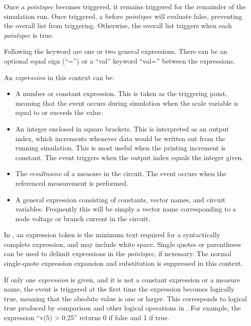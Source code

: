 Once a {\it pointspec} becomes triggered, it remains triggered for the
remainder of the simulation run.  Once triggered, a {\vt before} {\it
pointspec} will evaluate false, preventing the overall list from
triggering.  Otherwise, the overall list triggers when each {\it
pointspec} is true.

Following the keyword are one or two general expressions.  There can
be an optional equal sign (``{\vt =}'') or a ``{\vt val}'' keyword
``{\vt val=}'' between the expressions.

An {\it expression} in this context can be:
\begin{itemize}
\item{A number or constant expression.  This is taken as the
triggering point, meaning that the event occurs during simulation when
the scale variable is equal to or exceeds the value.}

\item{An integer enclosed in square brackets.  This is interpreted as
an output index, which increments whenever data would be written out
from the running simulation.  This is most useful when the printing
increment is constant.  The event triggers when the output index
equals the integer given.}

\item{The {\it resultname} of a measure in the circuit.  The event
occurs when the referenced measurement is performed.}

\item{A general expression consisting of constants, vector names, and
circuit variables.  Frequently this will be simply a vector name
corresponding to a node voltage or branch current in the circuit.}
\end{itemize}

In {\WRspice}, an expression token is the minimum text required for a
syntactically complete expression, and may include white space. 
Single quotes or parentheses can be used to delimit expressions in the
{\it pointspec}, if nexessary.  The normal single-quote expression
expansion and substitution is suppressed in this context.

If only one {\it expression} is given, and it is not a constant
expression or a measure name, the event is triggered at the first time
the expression becomes logically true, meaning that the absolute value
is one or larger.  This corresponds to logical true produced by
comparison and other logical operations in {\WRspice}.  For example,
the expression ``{\vt v(5) > 0.25}'' returns 0 if false and 1 if true.

